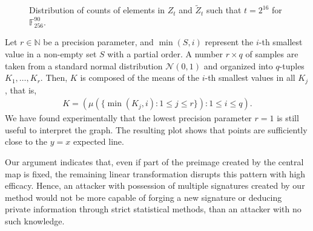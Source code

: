 \documentclass[english]{ufsc-thesis-rn46-2019/ufsc-thesis-rn46-2019}
\theoremstyle{definition}
\begin{document}
\begin{figure}[htbp]
  \caption{Distribution of counts of elements in $Z_{t}$ and
    $\widetilde{Z}_{t}$ such that $t = 2^{16}$ for
    $\mathbb{F}_{256}^{90}$.}\label{fig:dist-plot}
\end{figure}

Let $r \in \mathbb{N}$ be a precision parameter, and $\min(S, i)$ represent the
$i$-th smallest value in a non-empty set $S$ with a partial order. A number
$r \times q$ of samples are taken from a standard normal distribution
$\mathcal{N}(0, 1)$ and organized into $q$-tuples $K_{1}, \dots, K_{r}$. Then,
$K$ is composed of the means of the $i$-th smallest values in all $K_{j}$, that
is,
\begin{align}
  K = \left(
    \mu(\{\min(K_{j}, i) : 1 \leq j \leq r\}) : 1 \leq i \leq q
  \right).
\end{align}
We have found experimentally that the lowest precision parameter $r = 1$ is
still useful to interpret the graph. The resulting plot shows that points are
sufficiently close to the $y = x$ expected line.

Our argument indicates that, even if part of the preimage created by the
central map is fixed, the remaining linear transformation disrupts this pattern
with high efficacy. Hence, an attacker with possession of multiple signatures
created by our method would not be more capable of forging a new signature or
deducing private information through strict statistical methods, than an
attacker with no such knowledge.
\end{document}
